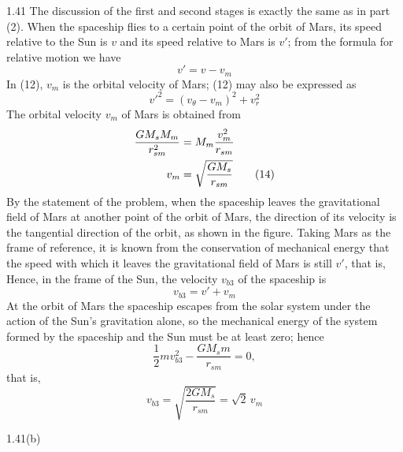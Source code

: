 \begin{solution}{1.41}
The discussion of the first and second stages is exactly the same as in part (2). When the spaceship flies to a certain point of the orbit of Mars, its speed relative to the Sun is $v$ and its speed relative to Mars is $v'$; from the formula for relative motion we have
\begin{equation}
v'=v-v_m \tag{12}
\end{equation}
In (12), $v_m$ is the orbital velocity of Mars; (12) may also be expressed as
\begin{equation}
v'^2=(v_\theta-v_m)^2+v_r^2 \tag{13}
\end{equation}
The orbital velocity $v_m$ of Mars is obtained from
\begin{align}
\frac{GM_sM_m}{r_{sm}^2}&=M_m\frac{v_m^2}{r_{sm}}\notag\\
v_m&=\sqrt{\frac{GM_s}{r_{sm}}} \tag{14}
\end{align}
By the statement of the problem, when the spaceship leaves the gravitational field of Mars at another point of the orbit of Mars, the direction of its velocity is the tangential direction of the orbit, as shown in the figure. Taking Mars as the frame of reference, it is known from the conservation of mechanical energy that the speed with which it leaves the gravitational field of Mars is still $v'$, that is,
Hence, in the frame of the Sun, the velocity $v_{b3}$ of the spaceship is
\begin{equation}
v_{b3}=v'+v_m \tag{15}
\end{equation}
At the orbit of Mars the spaceship escapes from the solar system under the action of the Sun's gravitation alone, so the mechanical energy of the system formed by the spaceship and the Sun must be at least zero; hence
\[
\frac{1}{2}mv_{b3}^2-\frac{GM_sm}{r_{sm}}=0,
\]
that is,
\begin{equation}
v_{b3}=\sqrt{\frac{2GM_s}{r_{sm}}}=\sqrt{2}\,v_m \tag{16}
\end{equation}

\begin{figbox}{1.41(b)}
\end{figbox}
\end{solution}

